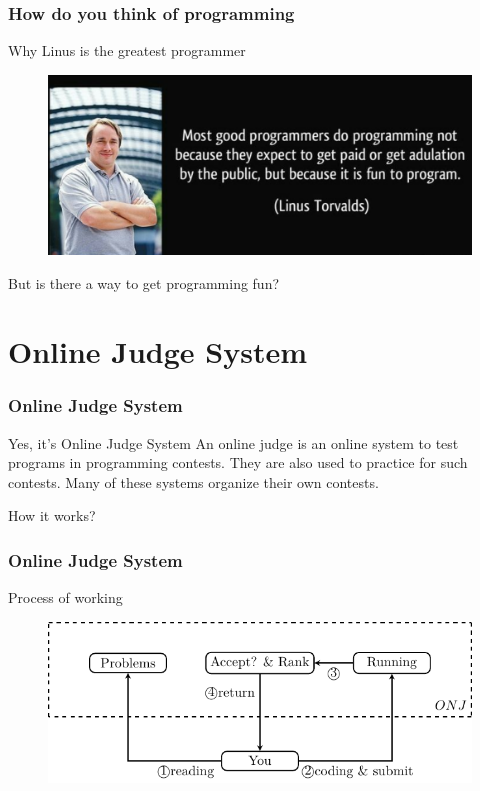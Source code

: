 \documentclass{beamer}
\begin{document}
\begin{frame}
  \frametitle{How do you think of programming}
  \LARGE{Why Linus is the greatest programmer}
  \begin{center}
    \begin{figure}
      \includegraphics[scale=.22]{./img/linus.png}
    \end{figure}
  \end{center}
  \Large{But is there a way to get programming fun?}

\end{frame}


\section{Online Judge System}
\begin{frame}
  \frametitle{Online Judge System}
  \Huge{Yes, it's Online Judge System}
  \Large{An online judge is an online system to test programs in programming contests. They are also used to practice for such contests. Many of these systems organize their own contests.}

  \Huge{How it works?}
  
\end{frame}

\begin{frame}
  \frametitle{Online Judge System}
  \LARGE{Process of working}
  \begin{center}
    \begin{figure}
      \includegraphics[scale=1.1]{./embed/online_judge.pdf}
    \end{figure}
  \end{center}
  
\end{frame}
\end{document}
